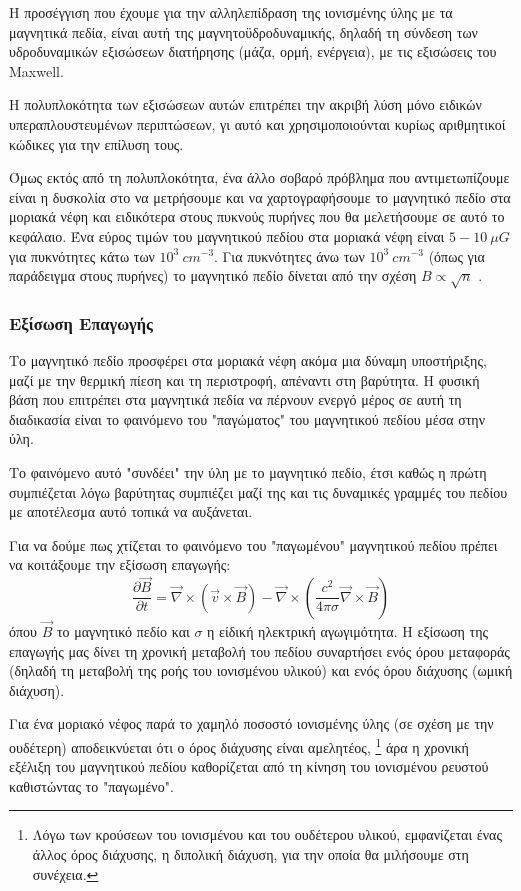\documentclass[a4paper,12pt]{memoir}
\newcommand{\pt}[1]{\frac{\partial #1}{\partial t}}
\newcommand{\vv}{\vec{v}}
\newcommand{\bb}{\vec{B}}
\newcommand{\nn}{\vec{\nabla}}
\begin{document}
Η προσέγγιση που έχουμε για την αλληλεπίδραση της ιονισμένης ύλης με τα μαγνητικά πεδία, είναι αυτή της μαγνητοϋδροδυναμικής, δηλαδή τη σύνδεση των υδροδυναμικών εξισώσεων διατήρησης (μάζα, ορμή, ενέργεια), με τις εξισώσεις του Maxwell.  

Η πολυπλοκότητα των εξισώσεων αυτών επιτρέπει την ακριβή λύση μόνο ειδικών υπεραπλουστευμένων περιπτώσεων, γι αυτό και χρησιμοποιούνται κυρίως αριθμητικοί κώδικες για την επίλυση τους.

Όμως εκτός από τη πολυπλοκότητα, ένα άλλο σοβαρό πρόβλημα που αντιμετωπίζουμε είναι η δυσκολία στο να μετρήσουμε και να χαρτογραφήσουμε το μαγνητικό πεδίο στα μοριακά νέφη και ειδικότερα στους πυκνούς πυρήνες που θα μελετήσουμε σε αυτό το κεφάλαιο. Ένα εύρος τιμών του μαγνητικού πεδίου στα μοριακά νέφη είναι $5-10\ \mu G$ για πυκνότητες κάτω των $10^3 \ cm^{-3}$. Για πυκνότητες άνω των $10^3 \ cm^{-3}$ (όπως για παράδειγμα στους πυρήνες) το μαγνητικό πεδίο δίνεται από την σχέση $B\propto \sqrt{n}$ \cite{crucher_2007}.

\subsubsection{Εξίσωση Επαγωγής}
Το μαγνητικό πεδίο προσφέρει στα μοριακά νέφη ακόμα μια δύναμη υποστήριξης, μαζί με την θερμική πίεση και τη περιστροφή, απέναντι στη βαρύτητα. Η φυσική βάση που επιτρέπει στα μαγνητικά πεδία να πέρνουν ενεργό μέρος σε αυτή τη διαδικασία είναι το φαινόμενο του "παγώματος" του μαγνητικού πεδίου μέσα στην ύλη.

Το φαινόμενο αυτό "συνδέει" την ύλη με το μαγνητικό πεδίο, έτσι καθώς η πρώτη συμπιέζεται λόγω βαρύτητας συμπιέζει μαζί της και τις δυναμικές γραμμές του πεδίου με αποτέλεσμα αυτό τοπικά να αυξάνεται.

Για να δούμε πως χτίζεται το φαινόμενο του "παγωμένου" μαγνητικού πεδίου πρέπει να κοιτάξουμε την εξίσωση επαγωγής:
\begin{equation}
\pt{\bb} = \nn \times (\vv \times \bb) -\nn \times \left( \frac{c^2}{4 \pi \sigma} \nn \times \bb \right) 
\end{equation}
όπου  $\bb$ το μαγνητικό πεδίο και $\sigma$ η είδική ηλεκτρική αγωγιμότητα.
Η εξίσωση της επαγωγής μας δίνει τη χρονική μεταβολή του πεδίου συναρτήσει ενός όρου μεταφοράς (δηλαδή τη μεταβολή της ροής του ιονισμένου υλικού) και ενός όρου διάχυσης (ωμική διάχυση).

Για ένα μοριακό νέφος παρά το χαμηλό ποσοστό ιονισμένης ύλης (σε σχέση με την ουδέτερη) αποδεικνύεται ότι ο όρος διάχυσης είναι αμελητέος, \footnote{Λόγω των κρούσεων του ιονισμένου και του ουδέτερου υλικού, εμφανίζεται ένας άλλος όρος διάχυσης, η διπολική διάχυση, για την οποία θα μιλήσουμε στη συνέχεια.} άρα η χρονική εξέλιξη του μαγνητικού πεδίου καθορίζεται από τη κίνηση του ιονισμένου ρευστού καθιστώντας το "παγωμένο".
\end{document}
